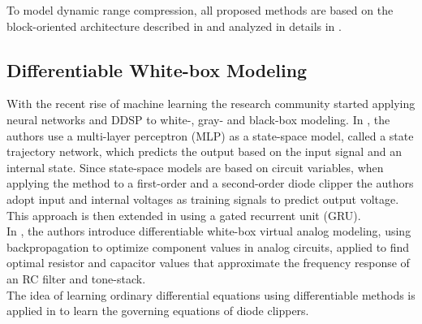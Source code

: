 To model dynamic range compression, all proposed methods 
\citep{
ramos2011block, 
eichas2016modeling} 
are based on the block-oriented architecture described in 
\citep{zolzer2002dafx} 
and analyzed in details in 
\citep{giannoulis2012digital}.

\subsection{Differentiable White-box Modeling}
\label{sec:back-diff-white-box}

With the recent rise of machine learning the research community started applying neural networks and DDSP to white-, gray- and black-box modeling.
In \citep{parker2019modelling}, the authors use a multi-layer perceptron (MLP) as a state-space model, called a state trajectory network, which predicts the output based on the input signal and an internal state.
Since state-space models are based on circuit variables, when applying the method to a first-order and a second-order diode clipper the authors adopt input and internal voltages as training signals to predict output voltage.
This approach is then extended in \citep{peussa2021exposure} using a gated recurrent unit (GRU).\\
In \citep{esqueda2021differentiable}, the authors introduce differentiable white-box virtual analog modeling, using backpropagation to optimize component values in analog circuits, applied to find optimal resistor and capacitor values that approximate the frequency response of an RC filter and tone-stack.\\
The idea of learning ordinary differential equations using differentiable methods is applied in \cite{wilczek2022virtual} to learn the governing equations of diode clippers.\\
